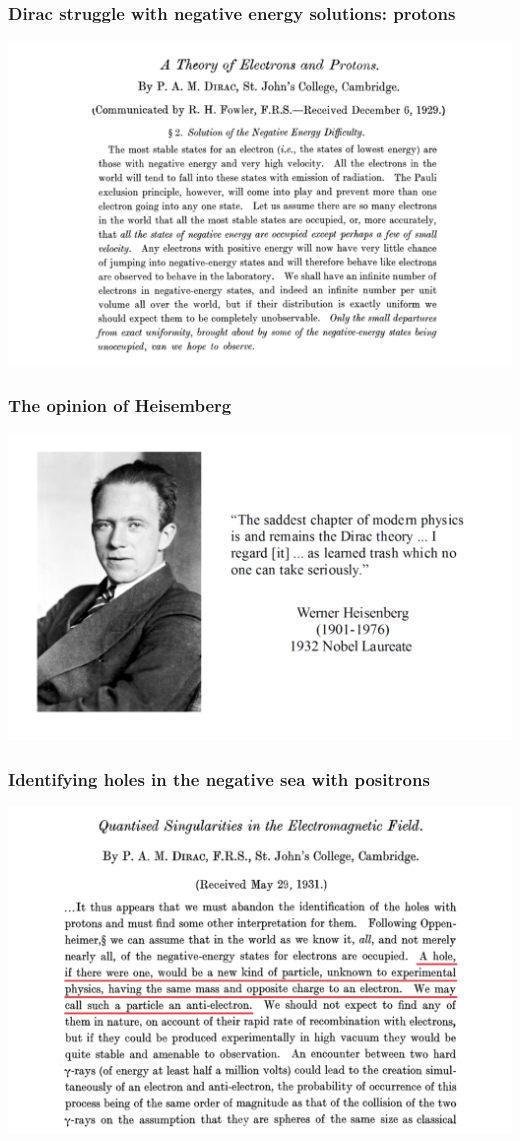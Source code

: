 \begin{frame}
\frametitle{Dirac struggle with negative energy solutions: protons}

\includegraphics[scale=0.3]{img/DiracElectronProton.png}
\end{frame}

\begin{frame}
\frametitle{The opinion of Heisemberg}

\includegraphics[scale=0.3]{img/HeisembergOpinionDirac.png}
\end{frame}

\begin{frame}
\frametitle{Identifying holes in the negative sea with positrons}

\includegraphics[scale=0.3]{img/diracPositrons.png}
\end{frame}

